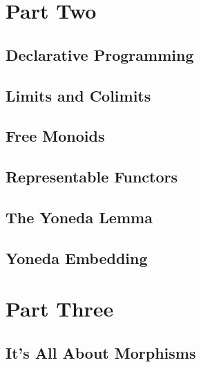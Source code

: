 \part*{Part Two}

\chapter{Declarative Programming}\label{declarative-programming}


\chapter{Limits and Colimits}\label{limits-and-colimits}


\chapter{Free Monoids}\label{free-monoids}


\chapter{Representable Functors}\label{representable-functors}


\chapter{The Yoneda Lemma}\label{the-yoneda-lemma}


\chapter{Yoneda Embedding}\label{yoneda-embedding}


\part*{Part Three}

\chapter{It's All About Morphisms} %


